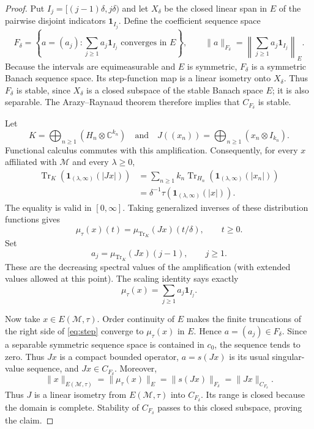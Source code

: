 \documentclass[11pt]{amsart}
\newcommand{\M}{\mathcal M}
\newcommand{\Tr}{\operatorname{Tr}}
\begin{document}
\begin{proof}
Put $I_j=[(j-1)\delta,j\delta)$ and let $X_\delta$ be the closed linear span
in $E$ of the pairwise disjoint indicators $\mathbf1_{I_j}$.  Define the
coefficient sequence space
\[
 F_\delta=\left\{a=(a_j):
     \sum_{j\geq1}a_j\mathbf1_{I_j}\text{ converges in }E\right\},
 \qquad
 \|a\|_{F_\delta}
 =\left\|\sum_{j\geq1}a_j\mathbf1_{I_j}\right\|_E.
\]
Because the intervals are equimeasurable and $E$ is symmetric,
$F_\delta$ is a symmetric Banach sequence space.  Its step-function map is a
linear isometry onto $X_\delta$.  Thus $F_\delta$ is stable, since
$X_\delta$ is a closed subspace of the stable Banach space $E$; it is also
separable.  The Arazy--Raynaud theorem therefore implies that
$C_{F_\delta}$ is stable.

Let
\[
 K=\bigoplus_{n\geq1}(H_n\otimes\mathbb C^{k_n})
 \quad\text{and}\quad
 J((x_n))=\bigoplus_{n\geq1}(x_n\otimes I_{k_n}).
\]
Functional calculus commutes with this amplification.  Consequently, for
every $x$ affiliated with $\M$ and every $\lambda\geq0$,
\begin{align*}
 \Tr_K\!\left(\mathbf1_{(\lambda,\infty)}(|Jx|)\right)
 &=\sum_{n\geq1}k_n
   \Tr_{H_n}\!\left(\mathbf1_{(\lambda,\infty)}(|x_n|)\right)\\
 &=\delta^{-1}\tau\!\left(
   \mathbf1_{(\lambda,\infty)}(|x|)\right).
\end{align*}
The equality is valid in $[0,\infty]$.  Taking generalized inverses of these
distribution functions gives
\[
 \mu_\tau(x)(t)=\mu_{\Tr_K}(Jx)(t/\delta),\qquad t\geq0.
\]
Set
\[
 a_j=\mu_{\Tr_K}(Jx)(j-1),\qquad j\geq1.
\]
These are the decreasing spectral values of the amplification (with extended
values allowed at this point).  The scaling identity says exactly
\begin{equation}\label{eq:step}
 \mu_\tau(x)
 =\sum_{j\geq1}a_j\mathbf1_{I_j}.
\end{equation}

Now take $x\in E(\M,\tau)$.  Order continuity of $E$ makes the finite
truncations of the right side of \eqref{eq:step} converge to
$\mu_\tau(x)$ in $E$.  Hence $a=(a_j)\in F_\delta$.  Since a separable
symmetric sequence space is contained in $c_0$, the sequence tends to zero.
Thus $Jx$ is a compact bounded operator, $a=s(Jx)$ is its usual singular-value
sequence, and $Jx\in C_{F_\delta}$.  Moreover,
\[
 \|x\|_{E(\M,\tau)}
 =\|\mu_\tau(x)\|_E
 =\|s(Jx)\|_{F_\delta}
 =\|Jx\|_{C_{F_\delta}}.
\]
Thus $J$ is a linear isometry from $E(\M,\tau)$ into
$C_{F_\delta}$.  Its range is closed because the domain is complete.
Stability of $C_{F_\delta}$ passes to this closed subspace, proving the
claim.
\end{proof}
\end{document}
